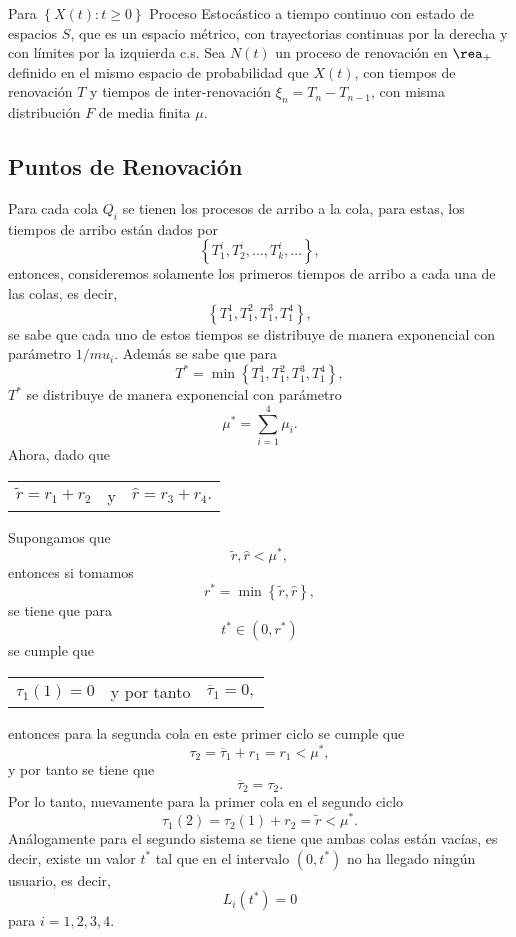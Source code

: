 Para $\left\{X\left(t\right):t\geq0\right\}$ Proceso Estoc\'astico a tiempo continuo con estado de espacios $S$, que es un espacio m\'etrico, con trayectorias continuas por la derecha y con l\'imites por la izquierda c.s. Sea $N\left(t\right)$ un proceso de renovaci\'on en $\rea_{+}$ definido en el mismo espacio de probabilidad que $X\left(t\right)$, con tiempos de renovaci\'on $T$ y tiempos de inter-renovaci\'on $\xi_{n}=T_{n}-T_{n-1}$, con misma distribuci\'on $F$ de media finita $\mu$.
\subsection{Puntos de Renovaci\'on}

Para cada cola $Q_{i}$ se tienen los procesos de arribo a la cola, para estas, los tiempos de arribo est\'an dados por $$\left\{T_{1}^{i},T_{2}^{i},\ldots,T_{k}^{i},\ldots\right\},$$ entonces, consideremos solamente los primeros tiempos de arribo a cada una de las colas, es decir, $$\left\{T_{1}^{1},T_{1}^{2},T_{1}^{3},T_{1}^{4}\right\},$$ se sabe que cada uno de estos tiempos se distribuye de manera exponencial con par\'ametro $1/mu_{i}$. Adem\'as se sabe que para $$T^{*}=\min\left\{T_{1}^{1},T_{1}^{2},T_{1}^{3},T_{1}^{4}\right\},$$ $T^{*}$ se distribuye de manera exponencial con par\'ametro $$\mu^{*}=\sum_{i=1}^{4}\mu_{i}.$$ Ahora, dado que 
\begin{center}
\begin{tabular}{lcl}
$\tilde{r}=r_{1}+r_{2}$ & y &$\hat{r}=r_{3}+r_{4}.$
\end{tabular}
\end{center}


Supongamos que $$\tilde{r},\hat{r}<\mu^{*},$$ entonces si tomamos $$r^{*}=\min\left\{\tilde{r},\hat{r}\right\},$$ se tiene que para  $$t^{*}\in\left(0,r^{*}\right)$$ se cumple que 
\begin{center}
\begin{tabular}{lcl}
$\tau_{1}\left(1\right)=0$ & y por tanto & $\overline{\tau}_{1}=0,$
\end{tabular}
\end{center}
entonces para la segunda cola en este primer ciclo se cumple que $$\tau_{2}=\overline{\tau}_{1}+r_{1}=r_{1}<\mu^{*},$$ y por tanto se tiene que  $$\overline{\tau}_{2}=\tau_{2}.$$ Por lo tanto, nuevamente para la primer cola en el segundo ciclo $$\tau_{1}\left(2\right)=\tau_{2}\left(1\right)+r_{2}=\tilde{r}<\mu^{*}.$$ An\'alogamente para el segundo sistema se tiene que ambas colas est\'an vac\'ias, es decir, existe un valor $t^{*}$ tal que en el intervalo $\left(0,t^{*}\right)$ no ha llegado ning\'un usuario, es decir, $$L_{i}\left(t^{*}\right)=0$$ para $i=1,2,3,4$.

